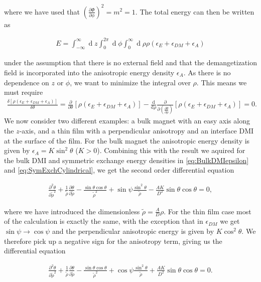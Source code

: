 \documentclass[1p]{elsarticle}		%
\renewcommand{\d}[1]{\ensuremath{\operatorname{d}\!{#1}}}
\numberwithin{equation}{section}
\begin{document}
where we have used that $(\frac{\partial\Phi}{\partial\phi})^2=m^2=1$. The total energy can then be written as

\begin{align}
E = \int_{-\infty}^{\infty}\d z \int_0^{2\pi} \d\phi\int_0^{\infty} \d\rho \rho \left(\epsilon_E + \epsilon_{DM} + \epsilon_A\right)
\end{align}

under the assumption that there is no external field and that the demangetization field is incorporated into the anisotropic energy density $\epsilon_A$. As there is no dependence on $z$ or $\phi$, we want to minimize the integral over $\rho$. This means we must require
\begin{align}
\frac{\delta \left[\rho\left(\epsilon_E+\epsilon_{DM}+\epsilon_A\right)\right]}{\delta\theta} = \frac{\partial}{\partial\theta}\left[\rho\left(\epsilon_E+\epsilon_{DM}+\epsilon_A\right)\right] - \frac{\textrm{d}}{\textrm{d}\rho} \frac{\partial}{\partial(\frac{\partial \theta}{\partial\rho})}\left[\rho\left(\epsilon_E+\epsilon_{DM}+\epsilon_A\right)\right] = 0.
\end{align}
We now consider two different examples: a bulk magnet with an easy axis along the $z$-axis, and a thin film with a perpendicular anisotropy and an interface DMI at the surface of the film. For the bulk magnet the anisotropic energy density is given by $\epsilon_A = K\sin^2\theta$ ($K>0$). Combining this with the result we aquired for the bulk DMI and symmetric exchange energy densities in \eqref{eq:BulkDMIepsilon} and \eqref{eq:SymExchCylindrical}, we get the second order differential equation

\begin{align}
\label{eq:ODEthetaBulk}
\frac{\partial^2\theta}{\partial\tilde{\rho}^2} + \frac{1}{\tilde{\rho}}\frac{\partial\theta}{\partial\tilde{\rho}} - \frac{\sin\theta\cos\theta}{\tilde{\rho}^2}+\sin\psi\frac{\sin^2\theta}{\tilde{\rho}}-\frac{AK}{D^2}\sin\theta\cos\theta = 0,
\end{align}

where we have introduced the dimensionless $\tilde{\rho} = \frac{A}{D}\rho$. For the thin film case most of the calculation is exactly the same, with the exception that in $\epsilon_{DM}$ we get $\sin\psi\rightarrow\cos\psi$ and the perpendicular anisotropic energy is given by $K\cos^2\theta$. We therefore pick up a negative sign for the anisotropy term, giving us the differential equation

\begin{align}
\label{eq:ODEthetaFilm}
\frac{\partial^2\theta}{\partial\tilde{\rho}^2} + \frac{1}{\tilde{\rho}}\frac{\partial\theta}{\partial\tilde{\rho}} - \frac{\sin\theta\cos\theta}{\tilde{\rho}^2}+\cos\psi\frac{\sin^2\theta}{\tilde{\rho}}+\frac{AK}{D^2}\sin\theta\cos\theta = 0.
\end{align}
\end{document}
